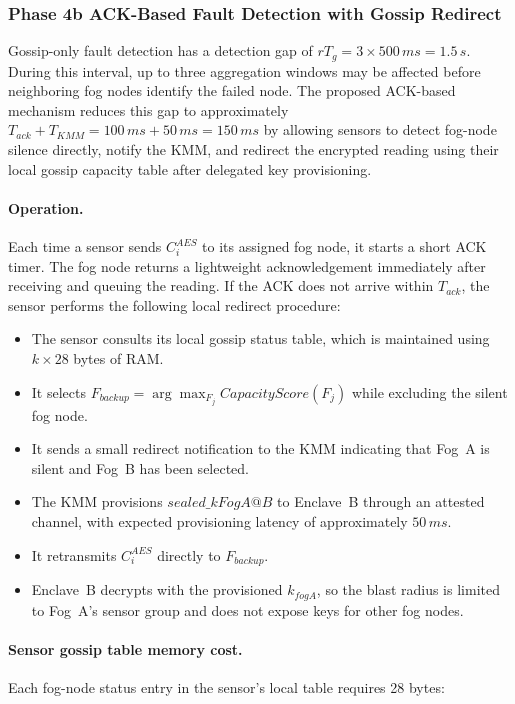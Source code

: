 \documentclass[conference]{IEEEtran}
\begin{document}
    \subsubsection{\textbf{Phase 4b ACK-Based Fault Detection with Gossip Redirect}}

    Gossip-only fault detection has a detection gap of $rT_g=3\times 500\,ms=1.5\,s$. During this interval, up to three aggregation windows may be affected before neighboring fog nodes identify the failed node. The proposed ACK-based mechanism reduces this gap to approximately $T_{ack}+T_{KMM}=100\,ms+50\,ms=150\,ms$ by allowing sensors to detect fog-node silence directly, notify the KMM, and redirect the encrypted reading using their local gossip capacity table after delegated key provisioning.

    \paragraph{Operation.}
    Each time a sensor sends $C_i^{AES}$ to its assigned fog node, it starts a short ACK timer. The fog node returns a lightweight acknowledgement immediately after receiving and queuing the reading. If the ACK does not arrive within $T_{ack}$, the sensor performs the following local redirect procedure:

    \begin{itemize}
        \item The sensor consults its local gossip status table, which is maintained using $k\times 28$ bytes of RAM.
        \item It selects $F_{backup}=\arg\max_{F_j} CapacityScore(F_j)$ while excluding the silent fog node.
        \item It sends a small redirect notification to the KMM indicating that Fog~A is silent and Fog~B has been selected.
        \item The KMM provisions $sealed\_kFogA@B$ to Enclave~B through an attested channel, with expected provisioning latency of approximately $50\,ms$.
        \item It retransmits $C_i^{AES}$ directly to $F_{backup}$.
        \item Enclave~B decrypts with the provisioned $k_{fogA}$, so the blast radius is limited to Fog~A's sensor group and does not expose keys for other fog nodes.
    \end{itemize}

    \paragraph{Sensor gossip table memory cost.}
    Each fog-node status entry in the sensor's local table requires 28 bytes:
\end{document}

